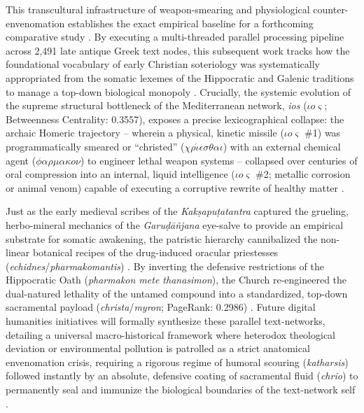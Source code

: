 \documentclass[11pt,twoside,letterpaper]{article}
\begin{document}
This transcultural infrastructure of weapon-smearing and physiological counter-envenomation establishes the exact empirical baseline for a forthcoming comparative study \citep{mccartneyforthcomingD}. By executing a multi-threaded parallel processing pipeline across 2,491 late antique Greek text nodes, this subsequent work tracks how the foundational vocabulary of early Christian soteriology was systematically appropriated from the somatic lexemes of the Hippocratic and Galenic traditions to manage a top-down biological monopoly \citep{mccartneyforthcomingD}. Crucially, the systemic evolution of the supreme structural bottleneck of the Mediterranean network, \textit{ios} ($\iota\mathit{o}\varsigma$; Betweenness Centrality: 0.3557), exposes a precise lexicographical collapse: the archaic Homeric trajectory -- wherein a physical, kinetic missile ($\iota\mathit{o}\varsigma$ \#1) was programmatically smeared or ``christed'' ($\chi\rho\mathit{\acute{\iota}}\epsilon\sigma\theta\alpha\iota$) with an external chemical agent ($\phi\alpha\rho\mu\alpha\kappa\mathit{o}\nu$) to engineer lethal weapon systems -- collapsed over centuries of oral compression into an internal, liquid intelligence ($\iota\mathit{o}\varsigma$ \#2; metallic corrosion or animal venom) capable of executing a corruptive rewrite of healthy matter \citep{mccartneyforthcomingD}. 

Just as the early medieval scribes of the \textit{Kakṣapuṭatantra} captured the grueling, herbo-mineral mechanics of the \textit{Garuḍāñjana} eye-salve to provide an empirical substrate for somatic awakening, the patristic hierarchy cannibalized the non-linear botanical recipes of the drug-induced oracular priestesses (\textit{echidnes}/\textit{pharmakomantis}) \citep{Wujastyk2025, mccartneyforthcomingD}. By inverting the defensive restrictions of the Hippocratic Oath (\textit{pharmakon mete thanasimon}), the Church re-engineered the dual-natured lethality of the untamed compound into a standardized, top-down sacramental payload (\textit{christa}/\textit{myron}; PageRank: 0.2986) \citep{mccartneyforthcomingD}. Future digital humanities initiatives will formally synthesize these parallel text-networks, detailing a universal macro-historical framework where heterodox theological deviation or environmental pollution is patrolled as a strict anatomical envenomation crisis, requiring a rigorous regime of humoral scouring (\textit{katharsis}) followed instantly by an absolute, defensive coating of sacramental fluid (\textit{chrio}) to permanently seal and immunize the biological boundaries of the text-network self \citep{mccartneyforthcomingD}.
\end{document}
